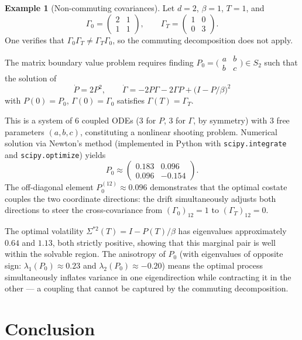 \documentclass[12pt]{article}
\theoremstyle{definition}
\newtheorem{example}[theorem]{Example}
\begin{document}
\begin{example}[Non-commuting covariances]\label{ex:noncommuting}
Let $d = 2$, $\beta = 1$, $T = 1$, and
\[
\Gamma_0 = \begin{pmatrix} 2 & 1 \\ 1 & 1 \end{pmatrix}, \qquad
\Gamma_T = \begin{pmatrix} 1 & 0 \\ 0 & 3 \end{pmatrix}.
\]
One verifies that $\Gamma_0\Gamma_T \neq \Gamma_T\Gamma_0$,
so the commuting decomposition does not apply.

The matrix boundary value problem requires finding
$P_0 = \bigl(\begin{smallmatrix} a & b \\ b & c \end{smallmatrix}\bigr) \in S_2$
such that the solution of
\[
\dot P = 2P^2, \qquad
\dot\Gamma = -2P\Gamma - 2\Gamma P
+ \bigl(I - P/\beta\bigr)^2
\]
with $P(0) = P_0$, $\Gamma(0) = \Gamma_0$
satisfies $\Gamma(T) = \Gamma_T$.

This is a system of 6 coupled ODEs (3 for $P$, 3 for $\Gamma$,
by symmetry) with 3 free parameters $(a, b, c)$,
constituting a nonlinear shooting problem.
Numerical solution via Newton's method (implemented in Python with
\texttt{scipy.integrate} and \texttt{scipy.optimize})
yields
\[
P_0 \approx \begin{pmatrix} 0.183 & 0.096 \\ 0.096 & -0.154 \end{pmatrix}.
\]
The off-diagonal element $P_0^{(12)} \approx 0.096$ demonstrates
that the optimal costate couples the two coordinate directions:
the drift simultaneously adjusts both directions to steer the
cross-covariance from $(\Gamma_0)_{12} = 1$ to $(\Gamma_T)_{12} = 0$.

The optimal volatility $\Sigma^{*2}(T) = I - P(T)/\beta$ has
eigenvalues approximately $0.64$ and $1.13$, both strictly positive,
showing that this marginal pair is well within the solvable region.
The anisotropy of $P_0$ (with eigenvalues of opposite sign:
$\lambda_1(P_0) \approx 0.23$ and $\lambda_2(P_0) \approx -0.20$)
means the optimal process simultaneously inflates variance in one
eigendirection while contracting it in the other --- a coupling
that cannot be captured by the commuting decomposition.
\end{example}

\section{Conclusion}\label{sec:conclusion}
\end{document}
